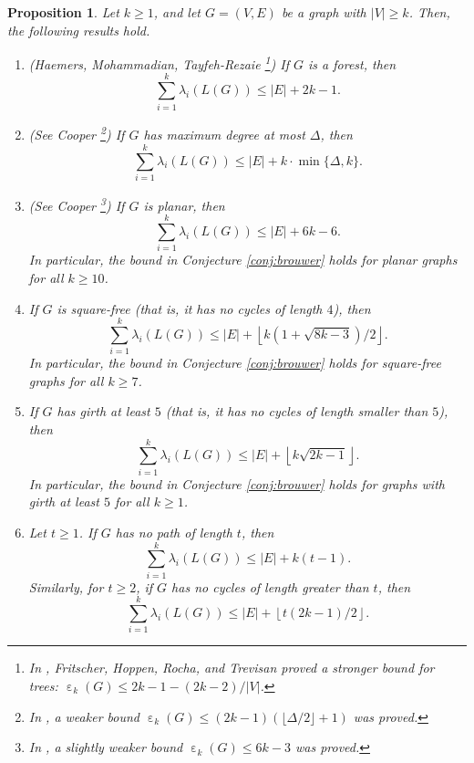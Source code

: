 \documentclass[a4paper,11pt]{article}
\theoremstyle{plain}
\newtheorem{proposition}[theorem]{\bf Proposition}
\theoremstyle{definition}
\numberwithin{theorem}{section}
\numberwithin{equation}{section}
\DeclareMathOperator{\eps}{\varepsilon}
\begin{document}
\begin{proposition}\label{prop:apps}
   Let $k\ge 1$, and let $G=(V,E)$ be a graph with $|V|\ge k$. Then, the following results hold.
   \begin{enumerate}
       \item (Haemers, Mohammadian, Tayfeh-Rezaie {\cite[Theorem 5]{haemers2010onthesum}}\footnote{In \cite{fritscher2011onthesum}, Fritscher, Hoppen, Rocha, and Trevisan
       proved a stronger bound for trees: $\eps_k(G)\le 2k-1 -(2k-2)/|V|$.}) If $G$ is a forest, then 
       \[
       \sum_{i=1}^k \lambda_i(L(G)) \le |E|+2k-1.
       \]

      \item (See Cooper \cite{cooper2021constraints}\footnote{In \cite{cooper2021constraints}, a weaker bound $\eps_k(G)\le (2k-1)(\lfloor\Delta/2\rfloor+1)$ was proved.}) If $G$ has maximum degree at most $\Delta$, then
       \[
         \sum_{i=1}^k \lambda_i(L(G))\le |E|+ k\cdot \min\{\Delta,k\}.
       \]
       
       \item (See Cooper \cite{cooper2021constraints}\footnote{In \cite{cooper2021constraints}, a slightly weaker bound $\eps_k(G)\le 6k-3$ was proved.}) If $G$ is planar, then
       \[
        \sum_{i=1}^k \lambda_i(L(G))\le |E|+ 6k-6.
       \]
       In particular, the bound in Conjecture \ref{conj:brouwer} holds for planar graphs for all $k\ge 10$.


       \item If $G$ is square-free (that is, it has no cycles of length $4$), then
       \[
       \sum_{i=1}^k \lambda_i(L(G))\le |E|+\left\lfloor k(1+\sqrt{8k-3})/2\right\rfloor.
       \]
       In particular, the bound in Conjecture \ref{conj:brouwer} holds for square-free graphs for all $k\ge 7$.
       \item If $G$ has girth at least $5$ (that is, it has no cycles of length smaller than $5$), then
       \[
       \sum_{i=1}^k \lambda_i(L(G))\le |E|+\left\lfloor k \sqrt{2k-1}\right\rfloor.
       \]
       In particular, the bound in Conjecture \ref{conj:brouwer} holds for graphs with girth at least $5$ for all $k\ge 1$.

       \item Let $t\ge 1$. If $G$ has no path of length $t$, then
       \[
            \sum_{i=1}^k \lambda_i(L(G))\le |E|+k(t-1). 
       \]
       Similarly, for $t\ge 2$, if $G$ has no cycles of length greater than $t$, then
       \[
        \sum_{i=1}^k \lambda_i(L(G))\le |E|+\left\lfloor t(2k-1)/2\right\rfloor.
       \]
   \end{enumerate}
\end{proposition}
\end{document}
